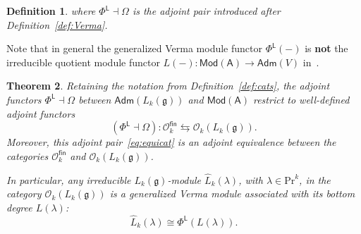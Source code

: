 \documentclass[12pt,a4paper,reqno]{amsart}
\numberwithin{equation}{section}
\newtheorem{theorem}{Theorem}[section]
\newtheorem{definition}[theorem]{Definition}
\theoremstyle{definition}
\newcommand{\g}{\mathfrak{g}}
\def\O{\mathcal{O}}
\def\Adm{\mathsf{Adm}}
\def\Mod{\mathsf{Mod}}
\def\fin{\mathsf{fin}}
\def\L{\mathsf{L}}
\def\Om{\Omega}
\def\Pr{\mathrm{Pr}}
\def\la{\lambda}
\def\ra{\rightarrow}
\def\A{\mathsf{A}}
\begin{document}
\begin{definition}
where $\Phi^\L\dashv \Om$ is the adjoint pair introduced after Definition~\ref{def:Verma}.
\end{definition}

Note that in general the generalized Verma module functor $\Phi^\L(-)$ is \textbf{not} the irreducible quotient module functor $L(-):\Mod(\A)\ra \Adm(V)$ in~\cite[Theorem 6.2]{DLM}.



\begin{theorem}\label{thm:equiofcats}
     Retaining the notation from Definition~\ref{def:cats}, the adjoint functors $\Phi^\L\dashv \Om$ between $\Adm(L_k(\g))$ and $\Mod(\A)$ restrict to well-defined adjoint functors
\begin{equation}\label{eq:equicat}
   (\Phi^\L\dashv \Om):\O_k^\fin\leftrightarrows \O_k(L_k(\g)).
\end{equation}
Moreover, this adjoint pair~\eqref{eq:equicat} is an adjoint equivalence between the categories $\O_k^\fin$ and $\O_k(L_k(\g))$.

In particular, any irreducible $L_k(\g)$-module $\hat{L}_k(\la)$, with $\la\in \Pr^k$, in the category $\O_k(L_k(\g))$ is a generalized Verma module associated with its bottom degree $L(\la)$:
\begin{equation}\label{eq:LklambdaVerma}
\hat{L}_k(\la)\cong \Phi^\L(L(\la)).
\end{equation}
\end{theorem}
\end{document}
